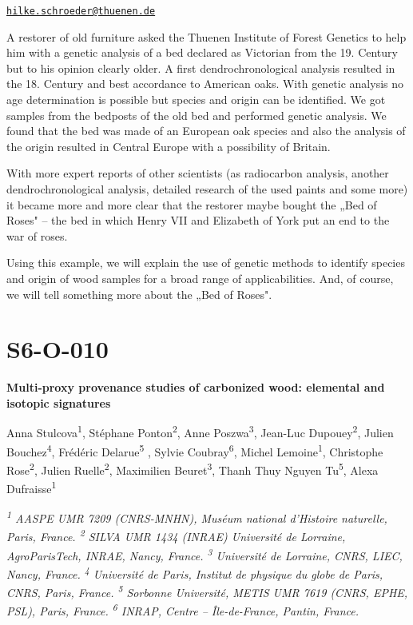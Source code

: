 \documentclass[
]{book}
\begin{document}
\href{mailto:hilke.schroeder@thuenen.de}{\nolinkurl{hilke.schroeder@thuenen.de}}

A restorer of old furniture asked the Thuenen Institute of Forest Genetics to help him with a genetic analysis of a bed declared as Victorian from the 19. Century but to his opinion clearly older. A first dendrochronological analysis resulted in the 18. Century and best accordance to American oaks. With genetic analysis no age determination is possible but species and origin can be identified. We got samples from the bedposts of the old bed and performed genetic analysis. We found that the bed was made of an European oak species and also the analysis of the origin resulted in Central Europe with a possibility of Britain.

With more expert reports of other scientists (as radiocarbon analysis, another dendrochronological analysis, detailed research of the used paints and some more) it became more and more clear that the restorer maybe bought the „Bed of Roses" -- the bed in which Henry VII and Elizabeth of York put an end to the war of roses.

Using this example, we will explain the use of genetic methods to identify species and origin of wood samples for a broad range of applicabilities. And, of course, we will tell something more about the „Bed of Roses".

\hypertarget{s6-o-010}{%
\section*{S6-O-010}\label{s6-o-010}}

\textbf{Multi-proxy provenance studies of carbonized wood: elemental and isotopic signatures}

Anna Stulcova\textsuperscript{1}, Stéphane Ponton\textsuperscript{2}, Anne Poszwa\textsuperscript{3}, Jean-Luc Dupouey\textsuperscript{2}, Julien Bouchez\textsuperscript{4}, Frédéric Delarue\textsuperscript{5} , Sylvie Coubray\textsuperscript{6}, Michel Lemoine\textsuperscript{1}, Christophe Rose\textsuperscript{2}, Julien Ruelle\textsuperscript{2}, Maximilien Beuret\textsuperscript{3}, Thanh Thuy Nguyen Tu\textsuperscript{5}, Alexa Dufraisse\textsuperscript{1}

\emph{\textsuperscript{1} AASPE UMR 7209 (CNRS-MNHN), Muséum national d'Histoire naturelle, Paris, France. \textsuperscript{2} SILVA UMR 1434 (INRAE) Université de Lorraine, AgroParisTech, INRAE, Nancy, France. \textsuperscript{3} Université de Lorraine, CNRS, LIEC, Nancy, France. \textsuperscript{4} Université de Paris, Institut de physique du globe de Paris, CNRS, Paris, France. \textsuperscript{5} Sorbonne Université, METIS UMR 7619 (CNRS, EPHE, PSL), Paris, France. \textsuperscript{6} INRAP, Centre -- Île-de-France, Pantin, France.}
\end{document}
